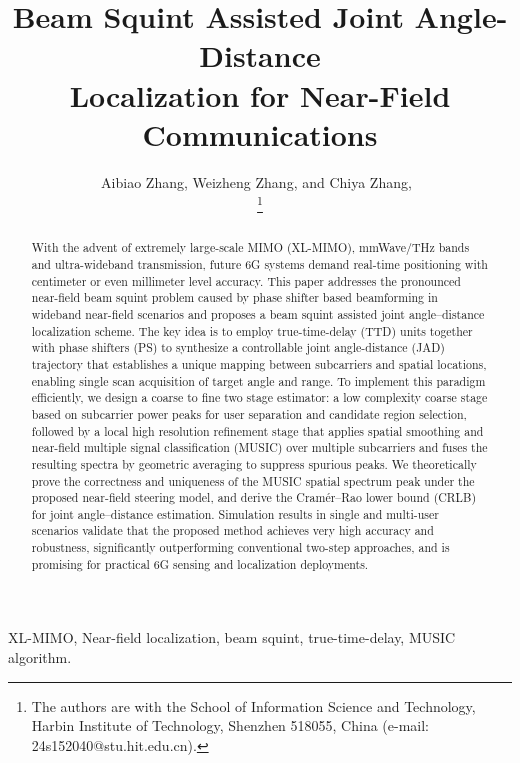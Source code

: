 \documentclass[lettersize,journal]{IEEEtran}
\begin{document}
\title{Beam Squint Assisted Joint Angle-Distance \\Localization for Near-Field Communications}

\author{Aibiao Zhang, Weizheng Zhang, and Chiya Zhang,~

\thanks{The authors are with the School of Information Science and Technology, Harbin Institute of Technology, Shenzhen 518055, China (e-mail: 24s152040@stu.hit.edu.cn).}}

\maketitle

\begin{abstract}
With the advent of extremely large-scale MIMO (XL-MIMO), mmWave/THz bands and ultra-wideband transmission, future 6G systems demand real-time positioning with centimeter or even millimeter level accuracy. This paper addresses the pronounced near-field beam squint problem caused by phase shifter based beamforming in wideband near-field scenarios and proposes a beam squint assisted joint angle–distance localization scheme. The key idea is to employ true-time-delay (TTD) units together with phase shifters (PS) to synthesize a controllable joint angle-distance (JAD) trajectory that establishes a unique mapping between subcarriers and spatial locations, enabling single scan acquisition of target angle and range. To implement this paradigm efficiently, we design a coarse to fine two stage estimator: a low complexity coarse stage based on subcarrier power peaks for user separation and candidate region selection, followed by a local high resolution refinement stage that applies spatial smoothing and near-field multiple signal classification (MUSIC) over multiple subcarriers and fuses the resulting spectra by geometric averaging to suppress spurious peaks. We theoretically prove the correctness and uniqueness of the MUSIC spatial spectrum peak under the proposed near-field steering model, and derive the Cramér–Rao lower bound (CRLB) for joint angle–distance estimation. Simulation results in single  and multi-user scenarios validate that the proposed method achieves very high accuracy and robustness, significantly outperforming conventional two-step approaches, and is promising for practical 6G sensing and localization deployments. 
\end{abstract}

\begin{IEEEkeywords}
XL-MIMO, Near-field localization, beam squint, true-time-delay, MUSIC algorithm.
\end{IEEEkeywords}
\end{document}
